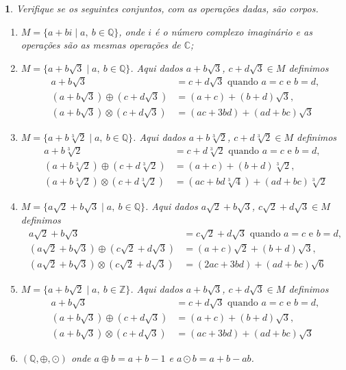 \documentclass[12pt]{exam}
\newtheorem{exercicio}{}
\newcommand{\cp}[1]{\mathbb{#1}}
\begin{document}
\begin{exercicio}
Verifique se os seguintes conjuntos, com as operações dadas, s\~ao corpos.
\begin{enumerate}[label={\alph*})]
    \item $M = \{ a + bi \mid a,\ b \in \cp{Q}\}$, onde $i$ \'e o n\'umero complexo imagin\'ario e as operações são as mesmas operações de $\cp{C}$;
    \item $M = \{ a + b\sqrt{3} \mid a,\ b \in \cp{Q}\}$. Aqui dados $a + b\sqrt{3}$, $c + d\sqrt{3} \in M$ definimos
    \begin{align*}
      a + b\sqrt{3} &= c + d\sqrt{3} \mbox{ quando } a = c \mbox{ e } b = d,\\
      (a + b\sqrt{3}) \oplus (c + d\sqrt{3}) &= (a + c) + (b + d)\sqrt{3},\\
      (a + b\sqrt{3}) \otimes (c + d\sqrt{3}) &= (ac + 3bd) + (ad + bc)\sqrt{3}
    \end{align*}
    \item $M = \{ a + b\sqrt[3]{2} \mid a,\ b \in \cp{Q}\}$. Aqui dados $a + b\sqrt[3]{2}$, $c + d\sqrt[3]{2} \in M$ definimos
    \begin{align*}
      a + b\sqrt[3]{2} &= c + d\sqrt[3]{2} \mbox{ quando } a = c \mbox{ e } b = d,\\
      (a + b\sqrt[3]{2}) \oplus (c + d\sqrt[3]{2}) &= (a + c) + (b + d)\sqrt[3]{2},\\
      (a + b\sqrt[3]{2}) \otimes (c + d\sqrt[3]{2}) &= (ac + bd\sqrt[3]{4}) + (ad + bc)\sqrt[3]{2}
    \end{align*}
    \item $M = \{ a\sqrt{2} + b\sqrt{3} \mid a,\ b \in \cp{Q}\}$. Aqui dados $a\sqrt{2} + b\sqrt{3}$, $c\sqrt{2} + d\sqrt{3} \in M$ definimos
    \begin{align*}
      a\sqrt{2} + b\sqrt{3} &= c\sqrt{2} + d\sqrt{3} \mbox{ quando } a = c \mbox{ e } b = d,\\
      (a\sqrt{2} + b\sqrt{3}) \oplus (c\sqrt{2} + d\sqrt{3}) &= (a + c)\sqrt{2} + (b + d)\sqrt{3},\\
      (a\sqrt{2} + b\sqrt{3}) \otimes (c\sqrt{2} + d\sqrt{3}) &= (2ac + 3bd) + (ad + bc)\sqrt{6}
    \end{align*}
    \item $M = \{ a + b\sqrt{2} \mid a,\ b \in \cp{Z}\}$. Aqui dados $a + b\sqrt{3}$, $c + d\sqrt{3} \in M$ definimos
    \begin{align*}
      a + b\sqrt{3} &= c + d\sqrt{3} \mbox{ quando } a = c \mbox{ e } b = d,\\
      (a + b\sqrt{3}) \oplus (c + d\sqrt{3}) &= (a + c) + (b + d)\sqrt{3},\\
      (a + b\sqrt{3}) \otimes (c + d\sqrt{3}) &= (ac + 3bd) + (ad + bc)\sqrt{3}
    \end{align*}
    \item $(\cp{Q}, \oplus, \odot)$ onde $a \oplus b = a + b - 1$ e $a \odot b = a + b - ab$.
  \end{enumerate}  
\end{exercicio}
\end{document}
